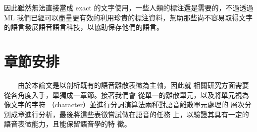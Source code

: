 因此雖然無法直接當成 exact 的文字使用，一些人類的標注還是需要的，不過透過 ML 我們已經可以盡量更有效的利用珍貴的標注資料，幫助那些尚不容易取得文字的語言發展語音語言科技，以協助保存他們的語言。


\section{章節安排}

　　由於本論文是以剖析既有的語音離散表徵為主軸，因此就
相關研究方面需要從各角度入手，單獨成一章節。接著我們會
從單一的離散單元，以及將單元視為像文字的字符
（character）並進行分詞演算法兩種對語音離散單元處理的
層次分別成章進行分析，最後將這些表徵嘗試做在語音的任務
上，以驗證其具有一定的語音表徵能力，且能保留語音學的特
徵。
